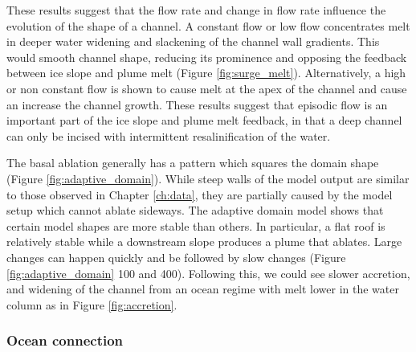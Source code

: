 These results suggest that the flow rate and change in flow rate influence the evolution of the shape of a channel. A constant flow or low flow concentrates melt in deeper water widening and slackening of the channel wall gradients. This would smooth channel shape, reducing its prominence and opposing the feedback between ice slope and plume melt (Figure \ref{fig:surge_melt}). 
Alternatively, a high or non constant flow is shown to cause melt at the apex of the channel and cause an increase the channel growth. 
These results suggest that episodic flow is an important part of the ice slope and plume melt feedback, in that a deep channel can only be incised with intermittent resalinification of the water. 

The basal ablation generally has a pattern which squares the domain shape (Figure \ref{fig:adaptive_domain}). While steep walls of the model output are similar to those observed in Chapter \ref{ch:data}, they are partially caused by the model setup which cannot ablate sideways. The adaptive domain model shows that certain model shapes are more stable than others. In particular, a flat roof is relatively stable while a downstream slope produces a plume that ablates. Large changes can happen quickly and be followed by slow changes (Figure \ref{fig:adaptive_domain} 100 and 400).  Following this, we could see slower accretion, and widening of the channel from an ocean regime with melt lower in the water column as in Figure \ref{fig:accretion}.

\subsubsection{Ocean connection}

